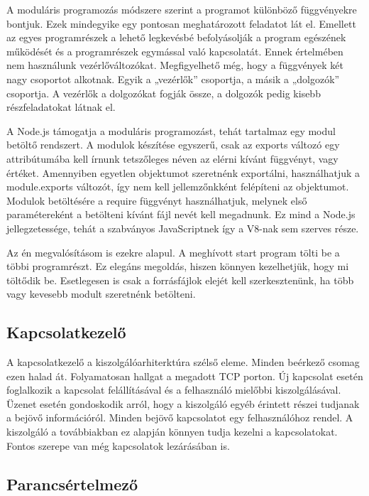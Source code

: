 \documentclass[bibliography=totocnumbered]{article}
\begin{document}
A moduláris programozás módszere szerint a programot különböző
függvényekre bontjuk. Ezek mindegyike egy pontosan meghatározott
feladatot lát el. Emellett az egyes programrészek a lehető legkevésbé
befolyásolják a program egészének működését és a programrészek egymással
való kapcsolatát. Ennek értelmében nem használunk vezérlőváltozókat.
Megfigyelhető még, hogy a függvények két nagy csoportot alkotnak. Egyik
a „vezérlők'' csoportja, a másik a „dolgozók'' csoportja. A vezérlők a
dolgozókat fogják össze, a dolgozók pedig kisebb részfeladatokat látnak
el.

A Node.js támogatja a moduláris programozást, tehát tartalmaz egy modul
betöltő rendszert. A modulok készítése egyszerű, csak az exports változó
egy attribútumába kell írnunk tetszőleges néven az elérni kívánt
függvényt, vagy értéket. Amennyiben egyetlen objektumot szeretnénk
exportálni, használhatjuk a module.exports változót, így nem kell
jellemzőnkként felépíteni az objektumot. Modulok betöltésére a require
függvényt használhatjuk, melynek első paramétereként a betölteni kívánt
fájl nevét kell megadnunk. Ez mind a Node.js jellegzetessége, tehát a
szabványos JavaScriptnek így a V8-nak sem szerves része.

Az én megvalósításom is ezekre alapul. A meghívott start program tölti
be a többi programrészt. Ez elegáns megoldás, hiszen könnyen
kezelhetjük, hogy mi töltődik be. Esetlegesen is csak a forrásfájlok
elejét kell szerkesztenünk, ha több vagy kevesebb modult szeretnénk
betölteni.


\subsection{Kapcsolatkezelő}

A kapcsolatkezelő a kiszolgálóarhiterktúra szélső eleme. Minden beérkező
csomag ezen halad át. Folyamatosan hallgat a megadott TCP porton. Új
kapcsolat esetén foglalkozik a kapcsolat felállításával és a felhasználó
mielőbbi kiszolgálásával. Üzenet esetén gondoskodik arról, hogy a
kiszolgáló egyéb érintett részei tudjanak a bejövő információról. Minden
bejövő kapcsolatot egy felhasználóhoz rendel. A kiszolgáló a
továbbiakban ez alapján könnyen tudja kezelni a kapcsolatokat. Fontos
szerepe van még kapcsolatok lezárásában is.


\subsection{Parancsértelmező}
\end{document}
